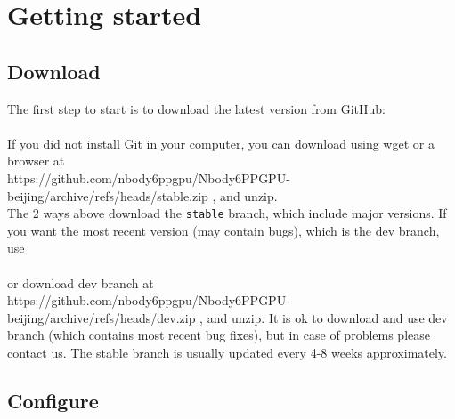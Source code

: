 
\section{Getting started}  \label{ch:startrun}

\subsection*{Download}

The first step to start is to download the latest version from GitHub: \\

 \\

If you did not install Git in your computer, you can download using wget or a browser at \\

{\small
https://github.com/nbody6ppgpu/Nbody6PPGPU-beijing/archive/refs/heads/stable.zip} , and unzip. \\

The 2 ways above download the \texttt{stable} branch, which include major versions. If you want the most recent version (may contain bugs), which is the dev branch, use \\

 \\

or download dev branch at \\

{\small https://github.com/nbody6ppgpu/Nbody6PPGPU-beijing/archive/refs/heads/dev.zip}
, and unzip. It is ok to download and use dev branch (which contains most recent bug fixes), but in case of problems please contact us. The stable branch is usually updated every 4-8 weeks approximately. \\

\subsection*{Configure}

